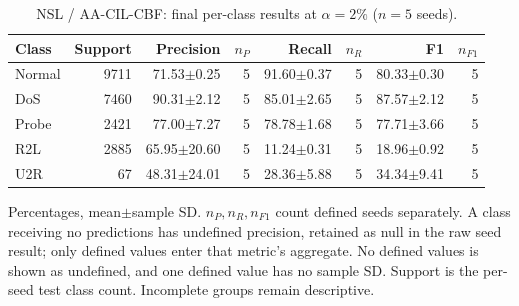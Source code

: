 \begin{table}[t]
\centering\scriptsize
\setlength{\tabcolsep}{3.3pt}
\caption{NSL / AA-CIL-CBF: final per-class results at $\alpha=2\%$ ($n=5$ seeds).}\label{tab:forgetting-class-nsl_kdd-aacil-cbf}
\begin{tabular}{lrrrrrrr}
\toprule
Class & Support & Precision & $n_P$ & Recall & $n_R$ & F1 & $n_{F1}$ \\
\midrule
Normal & 9711 & 71.53$\pm$0.25 & 5 & 91.60$\pm$0.37 & 5 & 80.33$\pm$0.30 & 5 \\
DoS & 7460 & 90.31$\pm$2.12 & 5 & 85.01$\pm$2.65 & 5 & 87.57$\pm$2.12 & 5 \\
Probe & 2421 & 77.00$\pm$7.27 & 5 & 78.78$\pm$1.68 & 5 & 77.71$\pm$3.66 & 5 \\
R2L & 2885 & 65.95$\pm$20.60 & 5 & 11.24$\pm$0.31 & 5 & 18.96$\pm$0.92 & 5 \\
U2R & 67 & 48.31$\pm$24.01 & 5 & 28.36$\pm$5.88 & 5 & 34.34$\pm$9.41 & 5 \\
\bottomrule
\end{tabular}
\par\smallskip\begin{minipage}{0.98\textwidth}\scriptsize Percentages, mean$\pm$sample SD. $n_P,n_R,n_{F1}$ count defined seeds separately. A class receiving no predictions has undefined precision, retained as null in the raw seed result; only defined values enter that metric's aggregate. No defined values is shown as undefined, and one defined value has no sample SD. Support is the per-seed test class count. Incomplete groups remain descriptive.\end{minipage}
\end{table}

